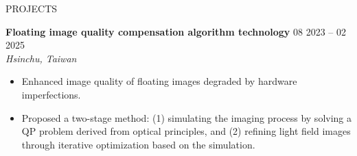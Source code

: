 \documentclass{resume}
\begin{document}
\begin{rSection}{PROJECTS}

    \item \textbf{Floating image quality compensation algorithm technology} \hfill {08 2023 -- 02 2025}\\
    \mbox{} \hfill \textit{Hsinchu, Taiwan}
    \begin{itemize}
        \item Enhanced image quality of floating images degraded by hardware imperfections.
        \item Proposed a two-stage method: (1) simulating the imaging process by solving a QP problem derived from optical principles, and (2) refining light field images through iterative optimization based on the simulation.
    \end{itemize}
\end{rSection} 


\end{document}
